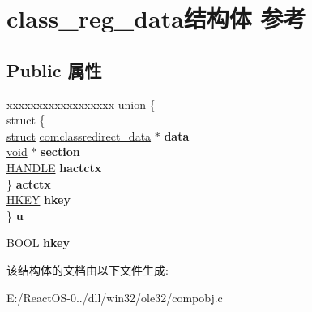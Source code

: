\hypertarget{structclass__reg__data}{}\section{class\+\_\+reg\+\_\+data结构体 参考}
\label{structclass__reg__data}
\subsection*{Public 属性}
\begin{DoxyCompactItemize}
\item 
\mbox{\label{structclass__reg__data_ac669bc5db6e086b1c2020ecdeb7ce139}} 
\begin{tabbing}
xx\=xx\=xx\=xx\=xx\=xx\=xx\=xx\=xx\=\kill
union \{\\
\>struct \{\\
\>\>\hyperlink{interfacestruct}{struct} \hyperlink{structcomclassredirect__data}{comclassredirect\_data} $\ast$ {\bfseries data}\\
\>\>\hyperlink{interfacevoid}{void} $\ast$ {\bfseries section}\\
\>\>\hyperlink{interfacevoid}{HANDLE} {\bfseries hactctx}\\
\>\} {\bfseries actctx}\\
\>\hyperlink{interfacevoid}{HKEY} {\bfseries hkey}\\
\} {\bfseries u}\\

\end{tabbing}\item 
\mbox{\label{structclass__reg__data_abb599b84a60564323a412f1ea56b788c}} 
B\+O\+OL {\bfseries hkey}
\end{DoxyCompactItemize}


该结构体的文档由以下文件生成\+:\begin{DoxyCompactItemize}
\item 
E\+:/\+React\+O\+S-\/0../dll/win32/ole32/compobj.\+c\end{DoxyCompactItemize}

